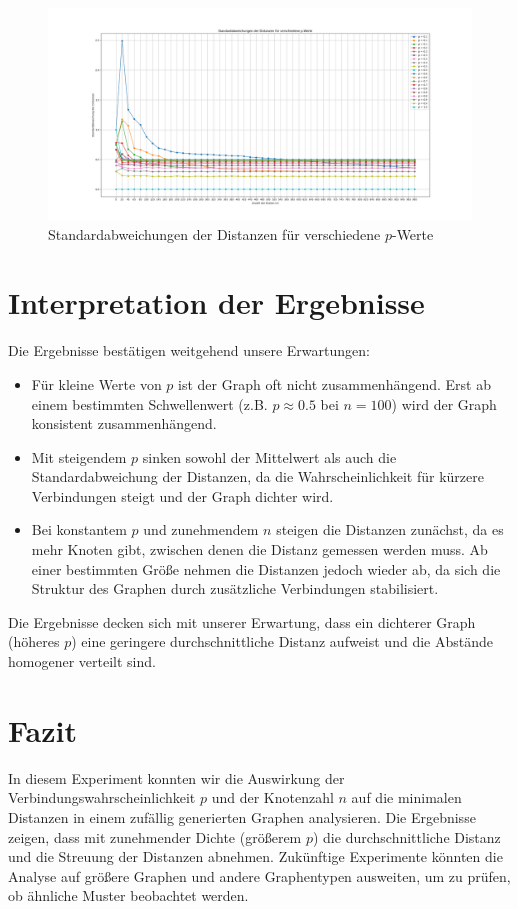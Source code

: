 \begin{figure}
    \centering
    \includegraphics[width=\textwidth]{Standardabweichungen}
    \caption{Standardabweichungen der Distanzen für verschiedene $p$-Werte}
    \label{fig:std_distances}
\end{figure}

\section{Interpretation der Ergebnisse}
Die Ergebnisse bestätigen weitgehend unsere Erwartungen:
\begin{itemize}
    \item Für kleine Werte von $p$ ist der Graph oft nicht zusammenhängend. Erst ab einem bestimmten Schwellenwert (z.B. $p \approx 0.5$ bei $n = 100$) wird der Graph konsistent zusammenhängend.
    \item Mit steigendem $p$ sinken sowohl der Mittelwert als auch die Standardabweichung der Distanzen, da die Wahrscheinlichkeit für kürzere Verbindungen steigt und der Graph dichter wird.
    \item Bei konstantem $p$ und zunehmendem $n$ steigen die Distanzen zunächst, da es mehr Knoten gibt, zwischen denen die Distanz gemessen werden muss. Ab einer bestimmten Größe nehmen die Distanzen jedoch wieder ab, da sich die Struktur des Graphen durch zusätzliche Verbindungen stabilisiert.
\end{itemize}

Die Ergebnisse decken sich mit unserer Erwartung, dass ein dichterer Graph (höheres $p$) eine geringere durchschnittliche Distanz aufweist und die Abstände homogener verteilt sind.

\section{Fazit}
In diesem Experiment konnten wir die Auswirkung der Verbindungswahrscheinlichkeit $p$ und der Knotenzahl $n$ auf die minimalen Distanzen in einem zufällig generierten Graphen analysieren. Die Ergebnisse zeigen, dass mit zunehmender Dichte (größerem $p$) die durchschnittliche Distanz und die Streuung der Distanzen abnehmen. Zukünftige Experimente könnten die Analyse auf größere Graphen und andere Graphentypen ausweiten, um zu prüfen, ob ähnliche Muster beobachtet werden.

